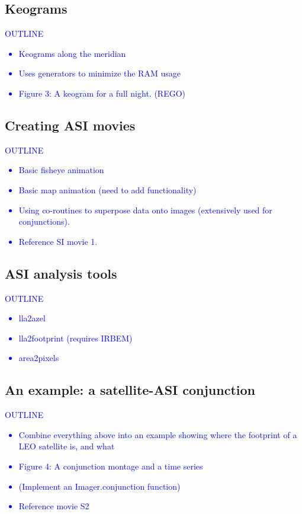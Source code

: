 \documentclass[draft]{agujournal2019}
\begin{document}
\subsection{Keograms}
\textcolor{blue}{
      OUTLINE
      \begin{itemize}
            \item Keograms along the meridian
            \item Uses generators to minimize the RAM usage
            \item Figure 3: A keogram for a full night. (REGO)
      \end{itemize}
}

\subsection{Creating ASI movies}
\textcolor{blue}{
      OUTLINE
      \begin{itemize}
            \item Basic fisheye animation
            \item Basic map animation (need to add functionality)
            \item Using co-routines to superpose data onto images (extensively used for conjunctions).
            \item Reference SI movie 1.
      \end{itemize}
}

\subsection{ASI analysis tools}
\textcolor{blue}{
      OUTLINE
      \begin{itemize}
            \item lla2azel
            \item lla2footprint (requires IRBEM)
            \item area2pixels
      \end{itemize}
}

\subsection{An example: a satellite-ASI conjunction}
\textcolor{blue}{
      OUTLINE
      \begin{itemize}
            \item Combine everything above into an example showing where the footprint of a LEO satellite is, and what 
            \item Figure 4: A conjunction montage and a time series
            \item (Implement an Imager.conjunction function)
            \item Reference movie S2
      \end{itemize}
}
\end{document}
